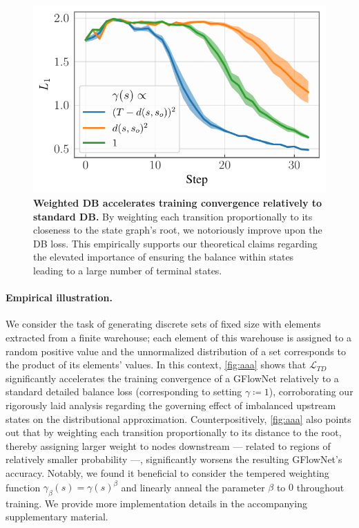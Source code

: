 \documentclass{article}
\theoremstyle{plain}
\theoremstyle{definition}
\theoremstyle{remark}
\theoremstyle{remark}
\begin{document}
\begin{figure}[!t] 
    \centering
    \includegraphics[width=.75\linewidth]{figures/avg_l1_gflownets_sets_weighted_db.pdf}
    \caption{\textbf{Weighted DB accelerates training convergence relatively to standard DB.} By weighting each transition proportionally to its closeness to the state graph's root, we notoriously improve upon the DB loss. This empirically supports our theoretical claims regarding the elevated importance of ensuring the balance within states leading to a large number of terminal states.}
    \label{fig:aaa}
\end{figure}

\paragraph{Empirical illustration.} 
We consider the task of generating discrete sets of fixed size with elements extracted from a finite warehouse; each element of this warehouse is assigned to a random positive value and the unnormalized distribution of a set corresponds to the product of its elements' values. 
In this context, \autoref{fig:aaa} shows that $\mathcal{L}_{TD}$ significantly accelerates the training convergence of a GFlowNet relatively to a standard detailed balance loss (corresponding to setting $\gamma \coloneqq 1$), corroborating our rigorously laid analysis regarding the governing effect of imbalanced upstream states on the distributional approximation. Counterpositively, \autoref{fig:aaa} also points out that by weighting each transition proportionally to its distance to the root, thereby assigning larger weight to nodes downstream --- related to regions of relatively smaller probability ---, significantly worsens the resulting GFlowNet's accuracy. Notably, we found it beneficial to consider the tempered weighting function $\gamma_{\beta}(s) = \gamma(s)^{\beta}$ and linearly anneal the parameter $\beta$ to $0$ throughout training. We provide more implementation details in the accompanying supplementary material.  
\end{document}
